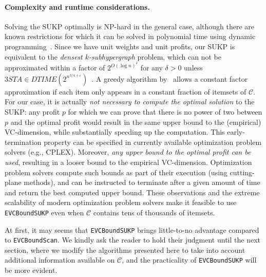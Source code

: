 \paragraph{Complexity and runtime considerations.} Solving the SUKP optimally
is NP-hard in the general case, although there are known restrictions for which
it can be solved in polynomial time using dynamic
programming~\citep{GoldschmidtNY94}. Since we have unit weights and unit
profits, our SUKP is equivalent to the \emph{densest $k$-subhypergraph} problem,
which can not be approximated within a factor of $2^{O(\log n)^\delta}$ for any
$\delta>0$ unless $3STA \in
DTIME(2^{n^{3/4+\varepsilon}})$~\citep{HajiaghayiJKLMRSV06}. A greedy algorithm
by~\citet{Arulselvan14} allows a constant factor approximation if each item only
appears in a constant fraction of itemsets of $\mathcal{C}$. For our case, it is
actually \emph{not necessary to compute the optimal solution} to the SUKP: any
profit $p$ for which we can prove that there is no power of two between $p$ and
the optimal profit would result in the same upper bound to the (empirical)
VC-dimension, while substantially speeding up the computation. This
early-termination property can be specified in currently available optimization
problem solvers (e.g., CPLEX). Moreover, \emph{any upper bound to the optimal profit
can be used}, resulting in a looser bound to the empirical VC-dimension.
Optimization problem solvers compute such bounds as part of their execution
(using cutting-plane methods), and can be instructed to terminate after a given
amount of time and return the best computed upper bound. These observations and
the extreme scalability of modern optimization problem solvers make it feasible
to use \texttt{EVCBoundSUKP} even when $\mathcal{C}$ contains tens of thousands
of itemsets.

At first, it may seems that \texttt{EVCBoundSUKP} brings little-to-no advantage
compared to \texttt{EVCBoundScan}. We kindly ask the reader to hold their
judgment until the next section, where we modify the algorithms presented here
to take into account additional information available on $\mathcal{C}$, and the
practicality of \texttt{EVCBoundSUKP} will be more evident.
